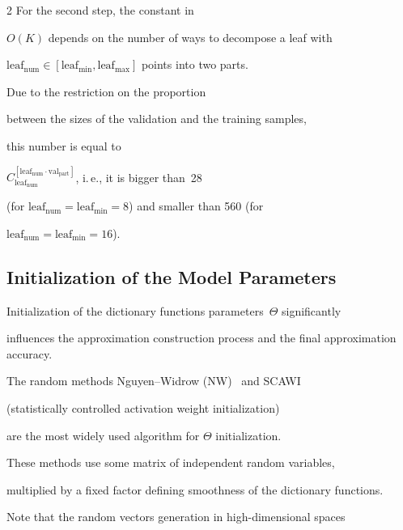 \begin{multicols}{2}
For the second step, the constant in

 $O(K)$ depends on the number of ways to decompose a leaf with 

 $\mathrm{leaf}_{\mathrm{num}}$\linebreak $\in [\mathrm{leaf}_{\min}, \mathrm{leaf}_{\max}]$ points into two parts. 

 Due to the restriction on the proportion

 between the sizes of the validation and the training samples,

  this number is equal to

 $C_{\mathrm{leaf}_{\mathrm{num}}}^{[\mathrm{leaf}_{\mathrm{num}}

 \cdot \mathrm{val}_{\mathrm{part}}]}$, i.\,e., it is bigger than~28 

 (for $\mathrm{leaf}_{\mathrm{num}} = \mathrm{leaf}_{\min} = 8$) and smaller than 560 (for 

  $\mathrm{leaf}_{\mathrm{num}} = \mathrm{leaf}_{\min} = 16$). 

  

\subsection{Initialization of the Model Parameters}

\label{init}



\noindent

Initialization of the dictionary functions parameters~$\Theta$ significantly 

influences the approximation construction process and the final approximation accuracy.

The random methods Nguyen--Widrow (NW)~\cite{initNW} and SCAWI

(statistically controlled activation weight initialization)~\cite{initSCAWI}

are the most widely used algorithm for $\Theta$ initialization.

These methods use some matrix of independent random variables,

   multiplied by a fixed factor defining smoothness of the dictionary functions.

   {

   

   }

   

Note that the random vectors generation in high-dimensional spaces


\end{multicols}
